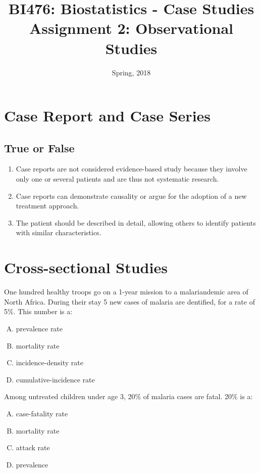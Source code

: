 \documentclass[11pt,a4paper]{article}
\title{\small{BI476: Biostatistics - Case Studies}\\
\Large{Assignment 2: Observational Studies}
}
\author{}
\date{Spring, 2018}
\begin{document}
\begin{CJK*}{UTF8}{gbsn}
\maketitle


\section{Case Report and Case Series}
\subsection{True or False}
\begin{enumerate}[(1)]
	\item Case reports are not considered evidence-based study because 
		they involve only one or several patients and are thus not 
		systematic research.
	\item Case reports can demonstrate causality or argue for the adoption 
		of a new treatment approach.
	\item The patient should be described in detail, allowing others to 
		identify patients with similar characteristics.
\end{enumerate}


\section{Cross-sectional Studies}
One hundred healthy troops go on a 1-year mission to a malariandemic area of North Africa. 
During their stay 5 new cases of malaria are dentified, for a rate of 5\%. This number is a:
\begin{enumerate}[(A)]
	\item prevalence rate
	\item mortality rate
	\item incidence-density rate
	\item cumulative-incidence rate
\end{enumerate}

Among untreated children under age 3, 20\% of malaria cases are fatal. 20\% is a:
\begin{enumerate}[(A)]
  \item case-fatality rate
  \item mortality rate
  \item attack rate
  \item prevalence
\end{enumerate}



\end{CJK*}
\end{document}
